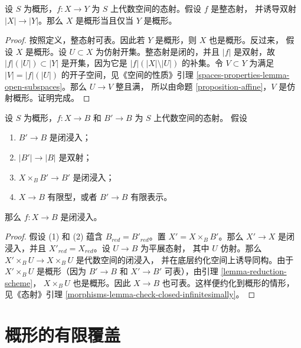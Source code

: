 \begin{lemma}
\label{lemma-integral-universally-bijective-scheme}
设 $S$ 为概形，$f : X \to Y$ 为 $S$ 上代数空间的态射。假设 $f$ 是整态射，
并诱导双射 $|X| \to |Y|$。那么 $X$ 是概形当且仅当 $Y$ 是概形。
\end{lemma}

\begin{proof}
按照定义，整态射可表。因此若 $Y$ 是概形，则 $X$ 也是概形。反过来，
假设 $X$ 是概形。设 $U \subset X$ 为仿射开集。整态射是闭的，并且 $|f|$
是双射，故 $|f|(|U|) \subset |Y|$ 是开集，因为它是
$|f|(|X| \setminus |U|)$ 的补集。令 $V \subset Y$ 为满足
$|V| = |f|(|U|)$ 的开子空间，见《空间的性质》引理
\ref{spaces-properties-lemma-open-subspaces}。那么 $U \to V$ 整且满，
所以由命题 \ref{proposition-affine}，$V$ 是仿射概形。证明完成。
\end{proof}

\begin{lemma}
\label{lemma-check-closed-infinitesimally}
设 $S$ 为概形，$f : X \to B$ 和 $B' \to B$ 为 $S$ 上代数空间的态射。
假设
\begin{enumerate}
\item $B' \to B$ 是闭浸入；
\item $|B'| \to |B|$ 是双射；
\item $X \times_B B' \to B'$ 是闭浸入；
\item $X \to B$ 有限型，或者 $B' \to B$ 有限表示。
\end{enumerate}
那么 $f : X \to B$ 是闭浸入。
\end{lemma}

\begin{proof}
假设 (1) 和 (2) 蕴含 $B_{red} = B'_{red}$。置
$X' = X \times_B B'$。那么 %
$X' \to X$ 是闭浸入，并且 $X'_{red} = X_{red}$。设 $U \to B$ 为平展态射，
其中 $U$ 仿射。那么 $X' \times_B U \to X \times_B U$ 是代数空间的闭浸入，
并在底层约化空间上诱导同构。由于 $X' \times_B U$ 是概形（因为
$B' \to B$ 和 $X' \to B'$ 可表），由引理 \ref{lemma-reduction-scheme}，
$X \times_B U$ 也是概形。因此 $X \to B$ 也可表。这样便约化到概形的情形，
见《态射》引理 \ref{morphisms-lemma-check-closed-infinitesimally}。
\end{proof}










\section{概形的有限覆盖}
\label{section-finite-cover}


